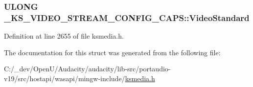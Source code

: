 \subsubsection[{\texorpdfstring{Video\+Standard}{VideoStandard}}]{\setlength{\rightskip}{0pt plus 5cm}U\+L\+O\+NG \+\_\+\+K\+S\+\_\+\+V\+I\+D\+E\+O\+\_\+\+S\+T\+R\+E\+A\+M\+\_\+\+C\+O\+N\+F\+I\+G\+\_\+\+C\+A\+P\+S\+::\+Video\+Standard}\hypertarget{struct___k_s___v_i_d_e_o___s_t_r_e_a_m___c_o_n_f_i_g___c_a_p_s_ac63a21d42fc19b87bf5bcb0fd7de72fe}{}\label{struct___k_s___v_i_d_e_o___s_t_r_e_a_m___c_o_n_f_i_g___c_a_p_s_ac63a21d42fc19b87bf5bcb0fd7de72fe}


Definition at line 2655 of file ksmedia.\+h.



The documentation for this struct was generated from the following file\+:\begin{DoxyCompactItemize}
\item 
C\+:/\+\_\+dev/\+Open\+U/\+Audacity/audacity/lib-\/src/portaudio-\/v19/src/hostapi/wasapi/mingw-\/include/\hyperlink{ksmedia_8h}{ksmedia.\+h}\end{DoxyCompactItemize}
